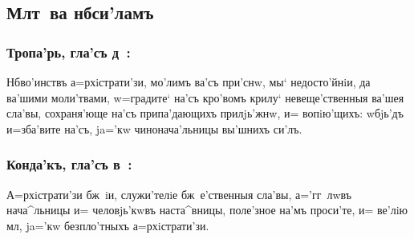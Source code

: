 \documentclass[12pt,twoside,xdvi,a6paper,civil=times]{hipbook}
\renewcommand{\*}{\raise3pt\hbox{\footnotesize*}}
\begin{document}
\subsection{Млт~ва нб си'ламъ}

\subsubsection{Тропа'рь, гла'съ д~:}

Нб во'инствъ а=рхiстрати'зи, мо'лимъ ва'съ при'снw, мы` недосто'йнiи, да
ва'шими мо\-ли'т\-ва\-ми, w=градите` на'съ кро'вомъ крилу` невеще'ственныя ва'шея
сла'вы, сохраня'юще на'съ припа'дающихъ прилjь'жнw, и= во\-пi\-ю'\-щихъ: w\т бjь'дъ
и=зба'вите на'съ, ja='кw чи\-но\-на\-ча'ль\-ни\-цы вы'шнихъ си'лъ.

\subsubsection{Конда'къ, гла'съ в~:}

А=рхiстрати'зи бж~iи, служи'телiе бж~е'ст\-вен\-ныя сла'вы, а='гг~лwвъ
нача^льницы и= че\-ло\-вjь'\-кwвъ наста^вницы, поле'зное на'мъ про\-си'\-те, и= ве'лiю
мл, ja='кw безпло'тныхъ а=рхiстрати'зи.

\baselineskip
\csendpictsmall
\end{document}
